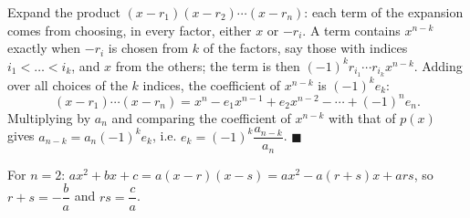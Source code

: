 Expand the product $(x-r_1)(x-r_2)\cdots(x-r_n)$: each term of the expansion comes from choosing, in every factor, either $x$ or $-r_i$. A term contains $x^{n-k}$ exactly when $-r_i$ is chosen from $k$ of the factors, say those with indices $i_1<\dots<i_k$, and $x$ from the others; the term is then $(-1)^kr_{i_1}\cdots r_{i_k}x^{n-k}$. Adding over all choices of the $k$ indices, the coefficient of $x^{n-k}$ is $(-1)^ke_k$:
\[(x-r_1)\cdots(x-r_n)=x^n-e_1x^{n-1}+e_2x^{n-2}-\cdots+(-1)^ne_n.\]
Multiplying by $a_n$ and comparing the coefficient of $x^{n-k}$ with that of $p(x)$ gives $a_{n-k}=a_n(-1)^ke_k$, i.e. $e_k=(-1)^k\dfrac{a_{n-k}}{a_n}$. $\blacksquare$

For $n=2$: $ax^2+bx+c=a(x-r)(x-s)=ax^2-a(r+s)x+ars$, so $r+s=-\dfrac ba$ and $rs=\dfrac ca$.
